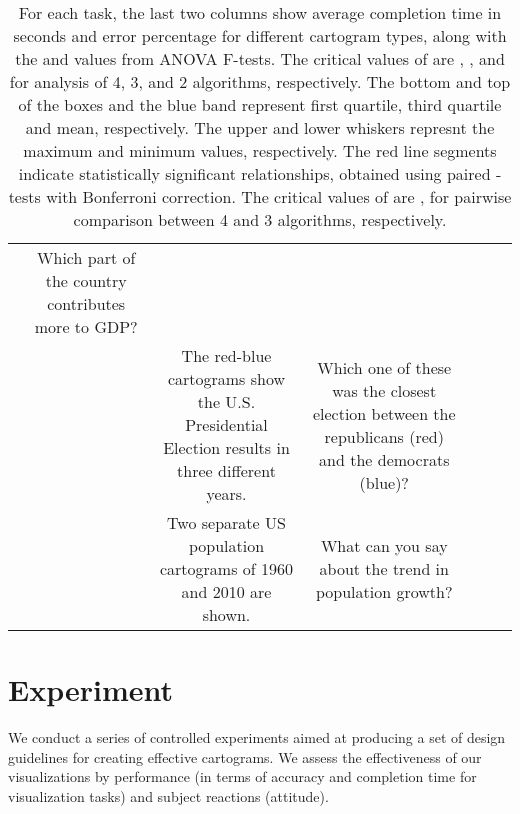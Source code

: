 \documentclass[10pt,journal,compsoc]{IEEEtran}
\begin{document}
\begin{table*}
\begin{tabular}{|c|c|c|c|c|c|c|}
&
\parbox{0.18\textwidth}
{
 \parbox{0.19\textwidth}{\small
 Which part of the country contributes more to GDP?}
}
 & & \\




& & \parbox{0.19\textwidth}{\small
The red-blue cartograms show the U.S. Presidential Election results in three different years.}


& 
\parbox{0.18\textwidth}
{
\hspace{-0.1cm}
\parbox{0.19\textwidth}{\small 
Which one of these was the closest election between the republicans (red) and the democrats (blue)?}
}
& & \\



& & \parbox{0.19\textwidth}{\small
 Two separate US population cartograms of 1960 and 2010 are shown.}


& \parbox{0.18\textwidth}{\small
 What can you say about the trend in population growth?} & & \\



\hline
\end{tabular}

\caption{\small For each task, the last two columns show average completion time in seconds
 and error percentage for different cartogram types, along with the  and  values from
 ANOVA F-tests. The critical values of  are , , and  for analysis of 4, 3, and 2 algorithms, respectively. The bottom and top of the boxes and the blue band represent first quartile, third quartile and mean, respectively.
The upper and lower whiskers represnt the maximum and minimum values, respectively.
 The red line segments indicate statistically significant relationships, obtained using
 paired -tests with Bonferroni correction. The critical values of  are ,  for pairwise comparison between 4 and 3 algorithms, respectively.}
  \label{fig:userstudy}
\label{tab:tasks}
\end{table*}





\section {Experiment}
\label{sec:experiment}



 We conduct a series of controlled experiments aimed
at producing a set of design guidelines for creating effective cartograms. We assess the effectiveness of our visualizations by performance (in terms of accuracy and completion time for visualization tasks) and subject reactions (attitude). 
\end{document}
